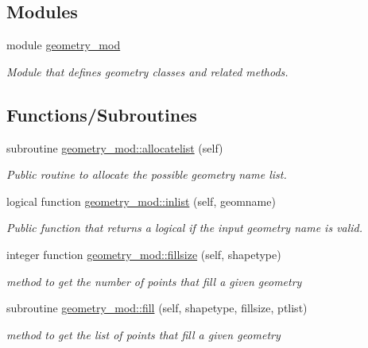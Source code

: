 \subsection*{Modules}
\begin{DoxyCompactItemize}
\item 
module \mbox{\hyperlink{namespacegeometry__mod}{geometry\+\_\+mod}}
\begin{DoxyCompactList}\small\item\em Module that defines geometry classes and related methods. \end{DoxyCompactList}\end{DoxyCompactItemize}
\subsection*{Functions/\+Subroutines}
\begin{DoxyCompactItemize}
\item 
subroutine \mbox{\hyperlink{namespacegeometry__mod_a1b6f259b0b6be71e02ffae7670f7d8ba}{geometry\+\_\+mod\+::allocatelist}} (self)
\begin{DoxyCompactList}\small\item\em Public routine to allocate the possible geometry name list. \end{DoxyCompactList}\item 
logical function \mbox{\hyperlink{namespacegeometry__mod_a22dd77024fce56da299445a697256155}{geometry\+\_\+mod\+::inlist}} (self, geomname)
\begin{DoxyCompactList}\small\item\em Public function that returns a logical if the input geometry name is valid. \end{DoxyCompactList}\item 
integer function \mbox{\hyperlink{namespacegeometry__mod_a92602e1198d3607613ea2722fb002685}{geometry\+\_\+mod\+::fillsize}} (self, shapetype)
\begin{DoxyCompactList}\small\item\em method to get the number of points that fill a given geometry \end{DoxyCompactList}\item 
subroutine \mbox{\hyperlink{namespacegeometry__mod_a095a8b47b3c23e154dcd31ab1441a065}{geometry\+\_\+mod\+::fill}} (self, shapetype, fillsize, ptlist)
\begin{DoxyCompactList}\small\item\em method to get the list of points that fill a given geometry \end{DoxyCompactList}\item 

\end{DoxyCompactItemize}
